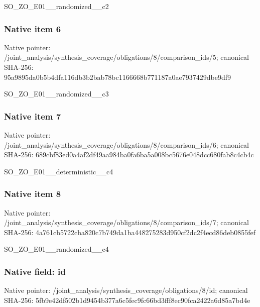 \documentclass[10pt,a4paper]{article}
\begin{document}
\begingroup\raggedright\sloppy SO\_\allowbreak{}ZO\_\allowbreak{}E01\_\allowbreak{}\_\allowbreak{}randomized\_\allowbreak{}\_\allowbreak{}c2\par\endgroup

\subsubsection{Native item 6}
Native pointer: /joint\_\allowbreak{}analysis/synthesis\_\allowbreak{}coverage/obligations/8/comparison\_\allowbreak{}ids/5; canonical SHA-256: 95a9895da0b5b4dfa116db3b2bab78bc1166668b771187a0ae7937429dbe9df9

\begingroup\raggedright\sloppy SO\_\allowbreak{}ZO\_\allowbreak{}E01\_\allowbreak{}\_\allowbreak{}randomized\_\allowbreak{}\_\allowbreak{}c3\par\endgroup

\subsubsection{Native item 7}
Native pointer: /joint\_\allowbreak{}analysis/synthesis\_\allowbreak{}coverage/obligations/8/comparison\_\allowbreak{}ids/6; canonical SHA-256: 689cbf83ed0a4af2df49aa984ba0fa6ba5a008bc5676e048dcc680fab8c4cb4c

\begingroup\raggedright\sloppy SO\_\allowbreak{}ZO\_\allowbreak{}E01\_\allowbreak{}\_\allowbreak{}deterministic\_\allowbreak{}\_\allowbreak{}c4\par\endgroup

\subsubsection{Native item 8}
Native pointer: /joint\_\allowbreak{}analysis/synthesis\_\allowbreak{}coverage/obligations/8/comparison\_\allowbreak{}ids/7; canonical SHA-256: 4a761cb5722cba820c7b749da1ba448275283d950cf2dc2f4ecd86deb0855fef

\begingroup\raggedright\sloppy SO\_\allowbreak{}ZO\_\allowbreak{}E01\_\allowbreak{}\_\allowbreak{}randomized\_\allowbreak{}\_\allowbreak{}c4\par\endgroup

\subsubsection{Native field: id}
Native pointer: /joint\_\allowbreak{}analysis/synthesis\_\allowbreak{}coverage/obligations/8/id; canonical SHA-256: 5fb9e42df502b1d9454b377a6c5fec9fc66bd3fff8ec90fca2422a6d85a7bd4e
\end{document}
